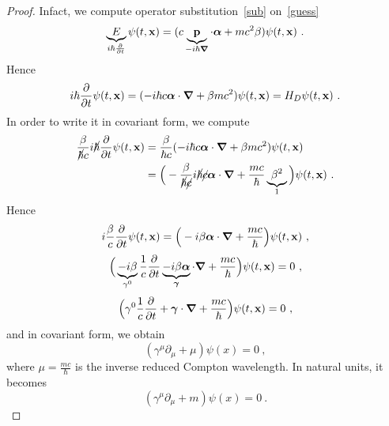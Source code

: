     \begin{proof}
        Infact, we compute operator substitution~\eqref{sub} on~\eqref{guess} 
        \begin{equation*}
            \underbrace{E}_{i\hbar \frac{\partial}{\partial t}} \psi(t, \mathbf x) = (c \underbrace{\mathbf p}_{ - i \hbar \boldsymbol \nabla} \cdot \boldsymbol \alpha + m c^2 \beta) \psi(t, \mathbf x) ~.
        \end{equation*}
        Hence
        \begin{equation*}
            i \hbar \frac{\partial}{\partial t} \psi (t, \mathbf x) = (- i \hbar c \boldsymbol \alpha \cdot \boldsymbol \nabla + \beta m c^2) \psi (t, \mathbf x) = H_D \psi(t, \mathbf x) ~.
        \end{equation*} 
        In order to write it in covariant form, we compute 
        \begin{equation*}
        \begin{aligned}
            \frac{\beta}{\cancel{\hbar} c} i \cancel{\hbar} \frac{\partial}{\partial t} \psi (t, \mathbf x) & = \frac{\beta}{\hbar c}(- i \hbar c \boldsymbol \alpha \cdot \boldsymbol \nabla + \beta m c^2) \psi (t, \mathbf x) \\ & = \Big ( - \frac{\beta}{\cancel{\hbar} \cancel{c}} i \cancel{\hbar} \cancel{c} \boldsymbol \alpha \cdot \boldsymbol \nabla + \frac{m c}{\hbar} \underbrace{\beta^2}_1 \Big ) \psi (t, \mathbf x) ~.
        \end{aligned}
        \end{equation*}
        Hence 
        \begin{equation*}
            i \frac{\beta}{c} \frac{\partial}{\partial t} \psi (t, \mathbf x) = \Big ( - i \beta \boldsymbol \alpha \cdot \boldsymbol \nabla + \frac{m c}{\hbar} \Big ) \psi (t, \mathbf x) ~,
        \end{equation*}
        \begin{equation*}
            \Big ( \underbrace{- i \beta}_{\gamma^0} \frac{1}{c} \frac{\partial}{\partial t} \underbrace{- i \beta \boldsymbol \alpha}_{\boldsymbol \gamma} \cdot \boldsymbol \nabla + \frac{m c}{\hbar} \Big ) \psi (t, \mathbf x) = 0 ~,
        \end{equation*}
        \begin{equation*}
            \Big ( \gamma^0 \frac{1}{c} \frac{\partial}{\partial t} + \boldsymbol \gamma \cdot \boldsymbol \nabla + \frac{m c}{\hbar} \Big ) \psi (t, \mathbf x) = 0 ~, 
        \end{equation*}
        and in covariant form, we obtain 
        \begin{equation*}
            (\gamma^\mu \partial_\mu + \mu ) \psi(x) = 0 ~,
        \end{equation*}
        where $\mu = \frac{m c}{\hbar}$ is the inverse reduced Compton wavelength. In natural units, it becomes 
        \begin{equation*}
            (\gamma^\mu \partial_\mu + m) \psi(x) = 0 ~.
        \end{equation*}


\end{proof}
